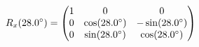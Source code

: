 \documentclass[preview]{standalone}
\begin{document}
\begin{align*}
\special{dvisvgm:raw <g id='unique000'>}R_x(28.0^\circ) = \begin{pmatrix} 1 & 0 & 0 \\ 0 & \cos(28.0^\circ) & -\sin(28.0^\circ) \\ 0 & \sin(28.0^\circ) & \cos(28.0^\circ) \end{pmatrix}\special{dvisvgm:raw </g>}
\end{align*}
\end{document}
